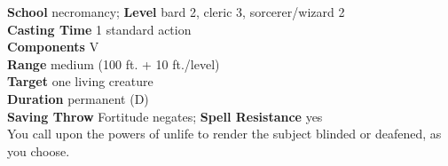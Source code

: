 \textbf{School} necromancy; \textbf{Level} bard 2, cleric 3, sorcerer/wizard 2\\
\textbf{Casting Time} 1 standard action\\
\textbf{Components} V\\
\textbf{Range }medium (100 ft. + 10 ft./level)\\
\textbf{Target} one living creature\\
\textbf{Duration} permanent (D)\\
\textbf{Saving Throw} Fortitude negates; \textbf{Spell Resistance} yes\\
You call upon the powers of unlife to render the subject blinded or deafened, as you choose.\\
